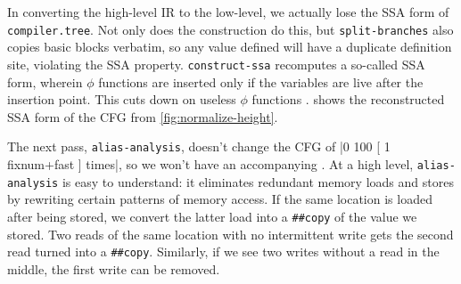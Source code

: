 
In converting the high-level \gls{IR} to the low-level, we actually lose the
\gls{SSA} form of \Verb|compiler.tree|.  Not only does the construction do
this, but \Verb|split-branches| also copies basic blocks verbatim, so any
value defined will have a duplicate definition site, violating the \gls{SSA}
property.  \Verb|construct-ssa| recomputes a so-called 
\gls{SSA} form, wherein $\phi$ functions are inserted only if the variables are
live after the insertion point.  This cuts down on useless $\phi$ 
%
functions \autocites{TDMSC,construct-ssa}.
%
 shows the reconstructed \gls{SSA} form of the
\gls{CFG} from \cref{fig:normalize-height}.

The next pass, \Verb|alias-analysis|, doesn't change the \gls{CFG} of
%
\factor|0 100 [ 1 fixnum+fast ] times|,
%
so we won't have an accompanying .  At a high
level, \Verb|alias-analysis| is easy to understand: it eliminates redundant
memory loads and stores by rewriting certain patterns of memory access.  If the
same location is loaded after being stored, we convert the latter load into a
\Verb|##copy| of the value we stored.  Two reads of the same location with no
intermittent write gets the second read turned into a \Verb|##copy|.
Similarly, if we see two writes without a read in the middle, the first write
can be removed.


